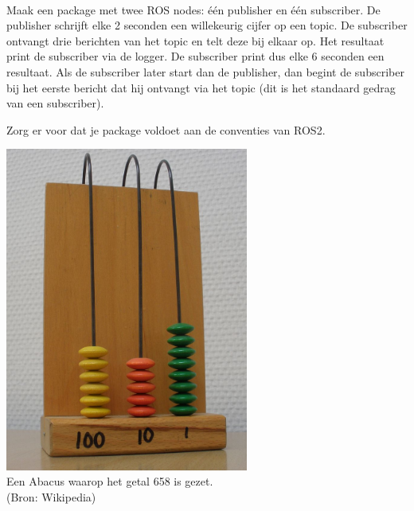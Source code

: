 \newpage %

\begin{exercise}[Abacus]\mbox{}\\
\begin{minipage}{0.6\textwidth}
Maak een package met twee ROS nodes: één publisher en één subscriber. De publisher schrijft elke 2 seconden een willekeurig cijfer op een topic. De subscriber ontvangt drie berichten van het topic en telt deze bij elkaar op. Het resultaat print de subscriber via de logger. De subscriber print dus elke 6 seconden een resultaat. Als de subscriber later start dan de publisher, dan begint de subscriber bij het eerste bericht dat hij ontvangt via het topic (dit is het standaard gedrag van een subscriber).

Zorg er voor dat je package voldoet aan de conventies van ROS2.
\end{minipage}\hfill 
\begin{minipage}{0.3\textwidth}
\begin{center}
\includegraphics[width=0.6\textwidth]{Pictures/Abacus_school.JPG}\\
Een Abacus waarop het getal 658 is gezet.\\{\tiny(Bron: Wikipedia)}\\
\end{center}
\end{minipage}
\end{exercise}

